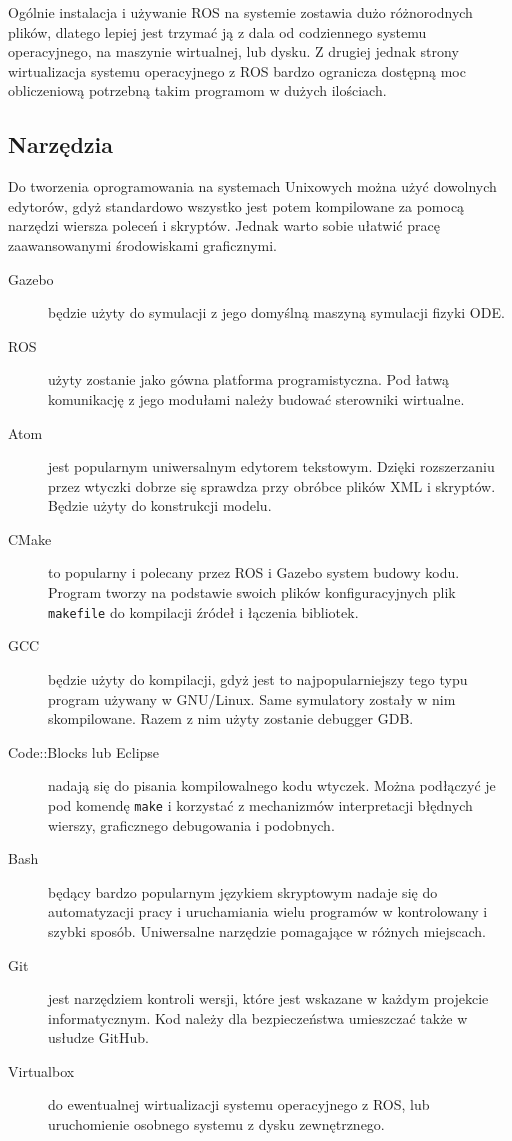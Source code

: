 Ogólnie instalacja i używanie ROS na systemie zostawia dużo różnorodnych plików, dlatego lepiej jest trzymać ją z dala od codziennego systemu operacyjnego, na maszynie wirtualnej, lub dysku.
Z drugiej jednak strony wirtualizacja systemu operacyjnego z ROS bardzo ogranicza dostępną moc obliczeniową potrzebną takim programom w dużych ilościach.

\subsection{Narzędzia}
Do tworzenia oprogramowania na systemach Unixowych można użyć dowolnych edytorów, gdyż standardowo wszystko jest potem kompilowane za pomocą narzędzi wiersza poleceń i skryptów.
Jednak warto sobie ułatwić pracę zaawansowanymi środowiskami graficznymi.
\begin{description}
 \item[Gazebo] będzie użyty do symulacji z jego domyślną maszyną symulacji fizyki ODE.
 \item[ROS] użyty zostanie jako gówna platforma programistyczna. Pod łatwą komunikację z jego modułami należy budować sterowniki wirtualne.
 \item[Atom] jest popularnym uniwersalnym edytorem tekstowym. Dzięki rozszerzaniu przez wtyczki dobrze się sprawdza przy obróbce plików XML i skryptów.
 Będzie użyty do konstrukcji modelu.
 \item[CMake] to popularny i polecany przez ROS i Gazebo system budowy kodu. Program tworzy na podstawie swoich plików konfiguracyjnych plik \texttt{makefile} do kompilacji źródeł i łączenia bibliotek.
 \item[GCC] będzie użyty do kompilacji, gdyż jest to najpopularniejszy tego typu program używany w GNU/Linux. Same symulatory zostały w nim skompilowane.
 Razem z nim użyty zostanie debugger GDB. 
 \item[Code::Blocks lub Eclipse] nadają się do pisania kompilowalnego kodu wtyczek. Można podłączyć je pod komendę \texttt{make} i korzystać z mechanizmów interpretacji błędnych wierszy, graficznego debugowania i podobnych.
 \item[Bash] będący bardzo popularnym językiem skryptowym nadaje się do automatyzacji pracy i uruchamiania wielu programów w kontrolowany i szybki sposób.
 Uniwersalne narzędzie pomagające w różnych miejscach.
 \item[Git] jest narzędziem kontroli wersji, które jest wskazane w każdym projekcie informatycznym. Kod należy dla bezpieczeństwa umieszczać także w usłudze GitHub.
 \item[Virtualbox] do ewentualnej wirtualizacji systemu operacyjnego z ROS, lub uruchomienie osobnego systemu z dysku zewnętrznego.
\end{description}

